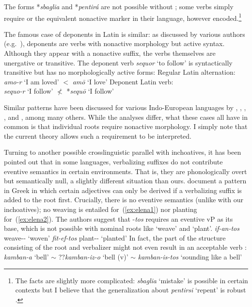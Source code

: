 The forms *\emph{sbaglia} and *\emph{pentir\'a} are not possible without ; some verbs simply require  or the equivalent nonactive marker in their language, however encoded.\footnote{The facts are slightly more complicated: \emph{sbaglia} `mistake' is possible in certain contexts but I believe that the generalization about \emph{pentirsi} `repent' is robust \citep[40]{burzio86}.}

The famous case of deponents in Latin is similar: as discussed by various authors (e.g.~\citealt{xuetal07}), deponents are verbs with nonactive morphology but active syntax. Although they appear with a nonactive suffix, the verbs themselves are unergative or transitive. The deponent verb \emph{sequor} `to follow' is syntactically transitive but has no morphologically active forms:
\pex
    \a Regular Latin alternation:\\
        \emph{amo-r} `I am loved' $<$ \emph{am\=o} `I love'
    \a Deponent Latin verb:\\
        \emph{sequo-r} `I follow' $\nless$ *\emph{sequ\=o} `I follow'
\xe

Similar patterns have been discussed for various Indo-European languages by \cite{aronoff94}, \cite{embick04}, \cite{kallulli13}, \cite{wood15springer}, \cite{kastnerzu17} and \cite{grestenberger18}, among many others. While the analyses differ, what these cases all have in common is that individual roots require nonactive morphology. I simply note that the current theory allows such a requirement to be interpreted.

Turning to another possible crosslinguistic parallel with inchoatives, it has been pointed out that in some languages, verbalizing suffixes do not contribute eventive semantics in certain environments. That is, they are phonologically overt but semantically null, a slightly different situation than ours. \citet{elenasamioti13,elenasamioti14} document a pattern in Greek in which certain adjectives can only be derived if a verbalizing suffix is added to the root first. Crucially, there is no eventive semantics (unlike with our inchoatives); no weaving is entailed for~(\ref{ex:elena1}) nor planting for~(\ref{ex:elena2}). {The authors suggest that -\emph{tos} requires an eventive vP as its base, which is not possible with nominal roots like `weave' and `plant'.}
\ex \label{ex:elena1} \emph{if-an-tos} weave-- `woven'
\xe
\ex \label{ex:elena2} \emph{fit-ef-tos} plant-- `planted' \hfill \citep[97]{elenasamioti14}
\xe
In fact, the part of the structure consisting of the root and verbalizer might not even result in an acceptable verb \citep[100]{elenasamioti14}:
\ex \emph{kamban-a} `bell' $\sim$ ??\emph{kamban-iz-o} `bell (v)' $\sim$ \emph{kamban-is-tos} `sounding like a bell'
\xe

